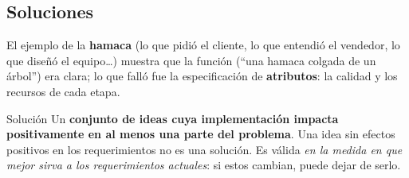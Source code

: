 \documentclass[11pt,a4paper]{article}
\begin{document}
\subsection{Soluciones}
\label{sec:soluciones}
El ejemplo de la \textbf{hamaca} (lo que pidió el cliente, lo que entendió el vendedor, lo que diseñó el
equipo\ldots) muestra que la función (``una hamaca colgada de un árbol'') era clara; lo que falló fue la
especificación de \textbf{atributos}: la calidad y los recursos de cada etapa.
\begin{defbox}{Solución}
Un \textbf{conjunto de ideas cuya implementación impacta positivamente en al menos una parte del problema}. Una
idea sin efectos positivos en los requerimientos no es una solución. Es válida \emph{en la medida en que mejor
sirva a los requerimientos actuales}: si estos cambian, puede dejar de serlo.
\end{defbox}
\end{document}
